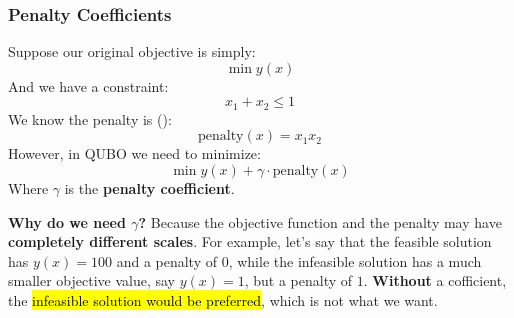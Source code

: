 \subsubsection{Penalty Coefficients}\label{sec:penalty-coefficients}

Suppose our original objective is simply:
\begin{equation*}
    \min y(x)
\end{equation*}
And we have a constraint:
\begin{equation*}
    x_1 + x_2 \le 1
\end{equation*}
We know the penalty is ():
\begin{equation*}
    \text{penalty}(x) = x_1 x_2
\end{equation*}
However, in QUBO we need to minimize:
\begin{equation*}
    \min y(x) + \gamma \cdot \text{penalty}(x)
\end{equation*}
Where $\gamma$ is the \textbf{penalty coefficient}.

\highspace
\textcolor{Green3}{ \textbf{Why do we need $\gamma$?}} Because the objective function and the penalty may have \textbf{completely different scales}. For example, let's say that the feasible solution has $y(x) = 100$ and a penalty of $0$, while the infeasible solution has a much smaller objective value, say $y(x) = 1$, but a penalty of $1$. \textbf{Without} a cofficient, the \hl{infeasible solution would be preferred}, which is not what we want.

